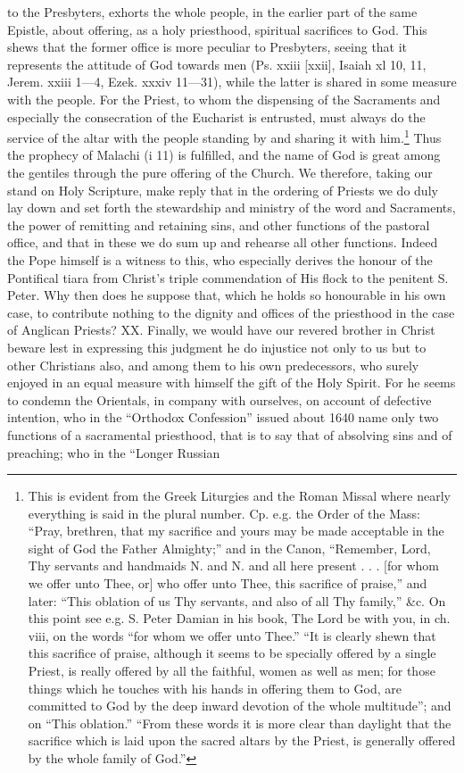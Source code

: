 to the Presbyters, exhorts the whole people, in the earlier part of the same Epistle, about offering, as a holy priesthood, spiritual sacrifices to God. This shews that the former office is more peculiar to Presbyters, seeing that it represents the attitude of God towards men (Ps. xxiii [xxii], Isaiah xl 10, 11, Jerem. xxiii 1—4, Ezek. xxxiv 11—31), while the latter is shared in some measure with the people. For the Priest, to whom the dispensing of the Sacraments and especially the consecration of the Eucharist is entrusted, must always do the service of the altar with the people standing by and sharing it with him.\footnote{This is evident from the Greek Liturgies and the Roman Missal where nearly everything is said in the plural number. Cp. e.g. the Order of the Mass: “Pray, brethren, that my sacrifice and yours may be made acceptable in the sight of God the Father Almighty;” and in the Canon, “Remember, Lord, Thy servants and handmaids N. and N. and all here present . . . [for whom we offer unto Thee, or] who offer unto Thee, this sacrifice of praise,” and later: “This oblation of us Thy servants, and also of all Thy family,” \&c. On this point see e.g. S. Peter Damian in his book, The Lord be with you, in ch. viii, on the words “for whom we offer unto Thee.” “It is clearly shewn that this sacrifice of praise, although it seems to be specially offered by a single Priest, is really offered by all the faithful, women as well as men; for those things which he touches with his hands in offering them to God, are committed to God by the deep inward devotion of the whole multitude”; and on “This oblation.” “From these words it is more clear than daylight that the sacrifice which is laid upon the sacred altars by the Priest, is generally offered by the whole family of God.”} Thus the prophecy of Malachi (i 11) is fulfilled, and the name of God is great among the gentiles through the pure offering of the Church. We therefore, taking our stand on Holy Scripture, make reply that in the ordering of Priests we do duly lay down and set forth the stewardship and ministry of the word and Sacraments, the power of remitting and retaining sins, and other functions of the pastoral office, and that in these we do sum up and rehearse all other functions. Indeed the Pope himself is a witness to this, who especially derives the honour of the Pontifical tiara from Christ’s triple commendation of His flock to the penitent S. Peter. Why then does he suppose that, which he holds so honourable in his own case, to contribute nothing to the dignity and offices of the priesthood in the case of Anglican Priests? XX. Finally, we would have our revered brother in Christ beware lest in expressing this judgment he do injustice not only to us but to other Christians also, and among them to his own predecessors, who surely enjoyed in an equal measure with himself the gift of the Holy Spirit. For he seems to condemn the Orientals, in company with ourselves, on account of defective intention, who in the “Orthodox Confession” issued about 1640 name only two functions of a sacramental priesthood, that is to say that of absolving sins and of preaching; who in the “Longer Russian

